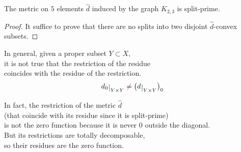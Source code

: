 \documentclass[./main.tex]{subfiles}
\begin{document}
\begin{proposition}
    The metric on $5$ elements $\hat{d}$ induced by the graph $K_{2,3}$ is split-prime.
\end{proposition}
\begin{proof}
    It suffice to prove that there are no splits into two disjoint $\hat{d}$-convex subsets.
\end{proof}

\begin{remark}
    In general, given a proper subset $Y \subset X$, \\
    it is not true that the restriction of the residue \\
    \bsp coincides with the residue of the restriction.
    \[ \restr{d_0}{\YY} \mathcolor{red}{\not}= \bigl(\restr{d}{\YY}\bigr)_0 \]

    In fact, the restriction of the metric $\hat{d}$ \\ 
    \bsp (that coincide with its residue since it is split-prime) \\
    is not the zero function because it is never $0$ outside the diagonal. \\
    But its restrictions are totally decomposable, \\
    \bsp so their residues are the zero function.
\end{remark}

\clearpage
\end{document}
